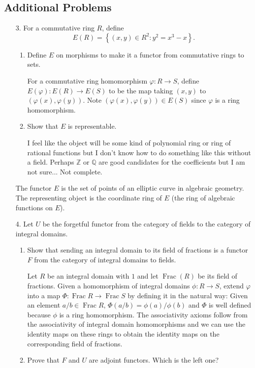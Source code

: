 \documentclass[11pt]{article}
\newcommand{\cbr}[1]{\left\{#1\right\}}
\DeclareMathOperator{\Frac}{Frac}
\begin{document}
\subsection*{Additional Problems}
\begin{enumerate}
    \item[3.] For a commutative ring $R$, define \[E(R) = \cbr{(x,y)\in R^2\colon y^2 = x^3-x}.\]\begin{enumerate}[label=(\roman*)]
        \item Define $E$ on morphisms to make it a functor from commutative rings to sets.
        
        For a commutative ring homomorphism $\varphi\colon R\to S$, define $E(\varphi)\colon E(R)\to E(S)$ to be the map taking $(x,y)$ to $(\varphi(x),\varphi(y))$. Note $(\varphi(x),\varphi(y))\in E(S)$ since $\varphi$ is a ring homomorphism.
        \item Show that $E$ is representable.
        
        I feel like the object will be some kind of polynomial ring or ring of rational functions but I don't know how to do something like this without a field. Perhaps $\mathbb{Z}$ or $\mathbb{Q}$ are good candidates for the coefficients but I am not sure... Not complete.
    \end{enumerate} The functor $E$ is the set of points of an elliptic curve in algebraic geometry. The representing object is the coordinate ring of $E$ (the ring of algebraic functions on $E$). 
    \item[4.] Let $U$ be the forgetful functor from the category of fields to the category of integral domains. \begin{enumerate}[label=(\roman*)]
        \item Show that sending an integral domain to its field of fractions is a functor $F$ from the category of integral domains to fields. 
        
        Let $R$ be an integral domain with $1$ and let $\Frac(R)$ be its field of fractions. Given a homomorphism of integral domains $\phi\colon R\to S$, extend $\varphi$ into a map $\Phi\colon \Frac{R} \to \Frac{S}$ by defining it in the natural way: Given an element $a/b\in \Frac{R}$, $\Phi(a/b) = \phi(a)/\phi(b)$ and $\Phi$ is well defined because $\phi$ is a ring homomorphism. The associativity axioms follow from the associativity of integral domain homomorphisms and we can use the identity maps on these rings to obtain the identity maps on the corresponding field of fractions.
        \item Prove that $F$ and $U$ are adjoint functors. Which is the left one?
        

\end{enumerate}
\end{enumerate}
\end{document}
